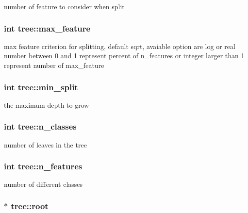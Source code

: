 number of feature to consider when split \hypertarget{classtree_a6f4304318f8f091f7d783ac1ec7d2775}{
\subsubsection[{max\+\_\+feature}]{\setlength{\rightskip}{0pt plus 5cm}int tree\+::max\+\_\+feature\hspace{0.3cm}{\ttfamily [protected]}}}\label{classtree_a6f4304318f8f091f7d783ac1ec7d2775}
max feature criterion for splitting, default {\ttfamily sqrt}, avaiable option are {\ttfamily log} or real number between 0 and 1 represent percent of {\ttfamily n\+\_\+features} or integer larger than 1 represent number of {\ttfamily max\+\_\+feature} \hypertarget{classtree_ae70cd626c0b50a0b8306a94a9e5e8fd7}{
\subsubsection[{min\+\_\+split}]{\setlength{\rightskip}{0pt plus 5cm}int tree\+::min\+\_\+split\hspace{0.3cm}{\ttfamily [protected]}}}\label{classtree_ae70cd626c0b50a0b8306a94a9e5e8fd7}
the maximum depth to grow \hypertarget{classtree_a3f074099473facb464acf152157bf4d0}{
\subsubsection[{n\+\_\+classes}]{\setlength{\rightskip}{0pt plus 5cm}int tree\+::n\+\_\+classes\hspace{0.3cm}{\ttfamily [protected]}}}\label{classtree_a3f074099473facb464acf152157bf4d0}
number of leaves in the tree \hypertarget{classtree_a48430ab4447259c35af5f22e894e1d6c}{
\subsubsection[{n\+\_\+features}]{\setlength{\rightskip}{0pt plus 5cm}int tree\+::n\+\_\+features\hspace{0.3cm}{\ttfamily [protected]}}}\label{classtree_a48430ab4447259c35af5f22e894e1d6c}
number of different classes \hypertarget{classtree_ad397d4906e47149b98f769b3e81473ee}{
\subsubsection[{root}]{$\ast$ tree\+::root\hspace{0.3cm}{\ttfamily [protected]}}}\label{classtree_ad397d4906e47149b98f769b3e81473ee}
